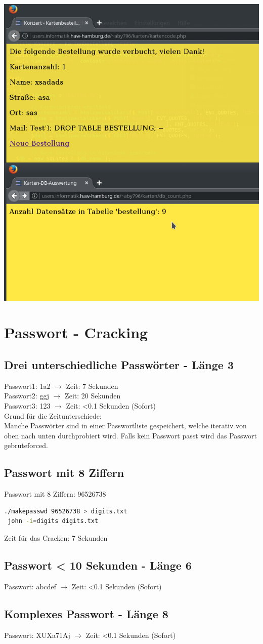 \documentclass[a4paper,10pt]{article}
\begin{document}
\includegraphics[scale=0.7]{sqli_fixed.png}
\section{Passwort - Cracking}
\subsection{Drei unterschiedliche Passwörter - Länge 3}
Passwort1: 1a2 $\rightarrow$ Zeit: 7 Sekunden \\
Passwort2: ggj $\rightarrow$ Zeit: 20 Sekunden \\
Passwort3: 123 $\rightarrow$ Zeit: <0.1 Sekunden (Sofort) \\
Grund für die Zeitunterschiede: \\
Manche Passwörter sind in einer Passwortliste gespeichert, welche iterativ von oben nach unten durchprobiert wird. Falls kein Passwort passt wird 
das Passwort gebruteforced. \\ 
\subsection{Passwort mit 8 Ziffern}
Passwort mit 8 Ziffern: 96526738 \\
\begin{lstlisting}[language=bash]
 ./makepasswd 96526738 > digits.txt
 john -i=digits digits.txt
 \end{lstlisting}
Zeit für das Cracken: 7 Sekunden 
\subsection{Passwort < 10 Sekunden - Länge 6}
Passwort: abcdef $\rightarrow$ Zeit: <0.1 Sekunden (Sofort)
\subsection{Komplexes Passwort - Länge 8}
Passwort: XUXa71Aj $\rightarrow$ Zeit: <0.1 Sekunden (Sofort)
\end{document}
